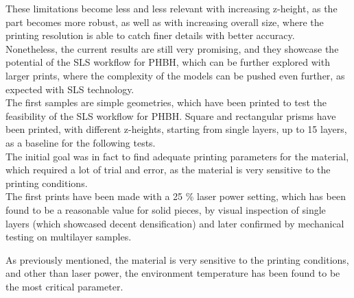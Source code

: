 \documentclass{article}
\begin{document}
        These limitations become less and less relevant with increasing z-height, as the part becomes 
        more robust, as well as with increasing overall size, where the printing resolution 
        is able to catch finer details with better accuracy. \\

        Nonetheless, the current results are still very promising, and they showcase the potential of the SLS workflow
        for PHBH, which can be further explored with larger prints, where the complexity of the models 
        can be pushed even further, as expected with SLS technology. \\  

        The first samples are simple geometries, which have been printed to test the feasibility of the SLS workflow 
        for PHBH. Square and rectangular prisms have been printed, with different z-heights, starting from single 
        layers, up to 15 layers, as a baseline for the following tests. \\ 

        The initial goal was in fact to find adequate printing parameters for the material, which required a lot 
        of trial and error, as the material is very sensitive to the printing conditions. \\

        The first prints have been made with a 25 \%  laser power setting, which has been found to be 
        a reasonable value for solid pieces, by visual inspection of single layers (which showcased 
        decent densification) and later confirmed by 
        mechanical testing on multilayer samples. 
        
        \clearpage

%

        As previously mentioned, the material is very sensitive to the printing conditions, and other than laser power,
        the environment temperature has been found to be the most critical parameter. \\ 
\end{document}
